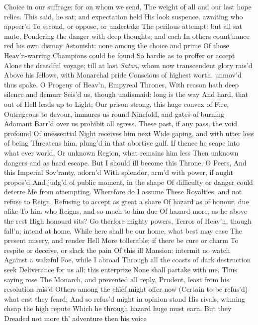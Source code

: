 \documentclass[11pt]{book}
\newcounter {last}
\begin{document}
Choice in our suffrage; for on whom we send, 
The weight of all and our last hope relies. 
\quad This said, he sat; and expectation held 
His look suspence, awaiting who appeer'd 
To second, or oppose, or undertake 
The perilous attempt: but all sat mute, 
Pondering the danger with deep thoughts; and each 
In others count'nance red his own dismay 
Astonisht: none among the choice and prime 
Of those Heav'n-warring Champions could be found 
So hardie as to proffer or accept 
Alone the dreadful voyage; till at last 
\textit{Satan}, whom now transcendent glory rais'd 
Above his fellows, with Monarchal pride 
Conscious of highest worth, unmov'd thus spake. 
\quad O Progeny of Heav'n, Empyreal Thrones, 
With reason hath deep silence and demurr 
Seis'd us, though undismaid: long is the way 
And hard, that out of Hell leads up to Light; 
Our prison strong, this huge convex of Fire, 
Outrageous to devour, immures us round 
Ninefold, and gates of burning Adamant 
Barr'd over us prohibit all egress. 
These past, if any pass, the void profound 
Of unessential Night receives him next 
Wide gaping, and with utter loss of being 
Threatens him, plung'd in that abortive gulf. 
If thence he scape into what ever world, 
Or unknown Region, what remains him less 
Then unknown dangers and as hard escape. 
But I should ill become this Throne, O Peers, 
And this Imperial Sov'ranty, adorn'd 
With splendor, arm'd with power, if aught propos'd 
And judg'd of public moment, in the shape 
Of difficulty or danger could deterre 
Me from attempting.  Wherefore do I assume 
These Royalties, and not refuse to Reign, 
Refusing to accept as great a share 
Of hazard as of honour, due alike 
To him who Reigns, and so much to him due 
Of hazard more, as he above the rest 
High honourd sits?  Go therfore mighty powers, 
Terror of Heav'n, though fall'n; intend at home, 
While here shall be our home, what best may ease 
The present misery, and render Hell 
More tollerable; if there be cure or charm 
To respite or deceive, or slack the pain 
Of this ill Mansion: intermit no watch 
Against a wakeful Foe, while I abroad 
Through all the coasts of dark destruction seek 
Deliverance for us all: this enterprize 
None shall partake with me.  Thus saying rose 
The Monarch, and prevented all reply, 
Prudent, least from his resolution rais'd 
Others among the chief might offer now 
(Certain to be refus'd) what erst they feard; 
And so refus'd might in opinion stand 
His rivals, winning cheap the high repute 
Which he through hazard huge must earn.  But they 
Dreaded not more th' adventure then his voice 
\end{document}
